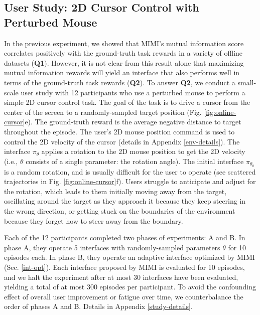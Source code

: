 \documentclass{article}
\begin{document}
\subsection{User Study: 2D Cursor Control with Perturbed Mouse} \label{user-study}

In the previous experiment, we showed that MIMI's mutual information score correlates positively with the ground-truth task rewards in a variety of offline datasets (\textbf{Q1}).
However, it is not clear from this result alone that maximizing mutual information rewards will yield an interface that also performs well in terms of the ground-truth task rewards (\textbf{Q2}).
To answer \textbf{Q2}, we conduct a small-scale user study with 12 participants who use a perturbed mouse to perform a simple 2D cursor control task.
The goal of the task is to drive a cursor from the center of the screen to a randomly-sampled target position (Fig. \ref{fig:online-cursor}e).
The ground-truth reward is the average negative distance to target throughout the episode.
The user's 2D mouse position command is used to control the 2D velocity of the cursor (details in Appendix \ref{env-details}).
The interface $\pi_{\theta}$ applies a rotation to the 2D mouse position to get the 2D velocity (i.e., $\theta$ consists of a single parameter: the rotation angle).
The initial interface $\pi_{\theta_0}$ is a random rotation, and is usually difficult for the user to operate (see scattered trajectories in Fig. \ref{fig:online-cursor}f).
Users struggle to anticipate and adjust for the rotation, which leads to them initially moving away from the target, oscillating around the target as they approach it because they keep steering in the wrong direction, or getting stuck on the boundaries of the environment because they forget how to steer away from the boundary.

Each of the 12 participants completed two phases of experiments: A and B.
In phase A, they operate 5 interfaces with randomly-sampled parameters $\theta$ for 10 episodes each.
In phase B, they operate an adaptive interface optimized by MIMI (Sec. \ref{int-opt}).
Each interface proposed by MIMI is evaluated for 10 episodes, and we halt the experiment after at most 30 interfaces have been evaluated, yielding a total of at most 300 episodes per participant.
To avoid the confounding effect of overall user improvement or fatigue over time, we counterbalance the order of phases A and B.
Details in Appendix \ref{study-details}.
\end{document}
